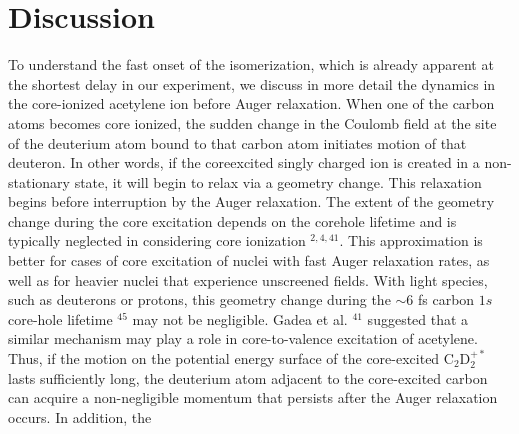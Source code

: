 \documentclass[10pt]{article}
\begin{document}
\section*{Discussion}
To understand the fast onset of the isomerization, which is already apparent at the shortest delay in our experiment, we discuss in more detail the dynamics in the core-ionized acetylene ion before Auger relaxation. When one of the carbon atoms becomes core ionized, the sudden change in the Coulomb field at the site of the deuterium atom bound to that carbon atom initiates motion of that deuteron. In other words, if the coreexcited singly charged ion is created in a non-stationary state, it will begin to relax via a geometry change. This relaxation begins before interruption by the Auger relaxation. The extent of the geometry change during the core excitation depends on the corehole lifetime and is typically neglected in considering core ionization ${ }^{2,4,41}$. This approximation is better for cases of core excitation of nuclei with fast Auger relaxation rates, as well as for heavier nuclei that experience unscreened fields. With light species, such as deuterons or protons, this geometry change during the $\sim 6$ fs carbon $1 s$ core-hole lifetime ${ }^{45}$ may not be negligible. Gadea et al. ${ }^{41}$ suggested that a similar mechanism may play a role in core-to-valence excitation of acetylene. Thus, if the motion on the potential energy surface of the core-excited $\mathrm{C}_{2} \mathrm{D}_{2}^{+*}$ lasts sufficiently long, the deuterium atom adjacent to the core-excited carbon can acquire a non-negligible momentum that persists after the Auger relaxation occurs. In addition, the
\end{document}
